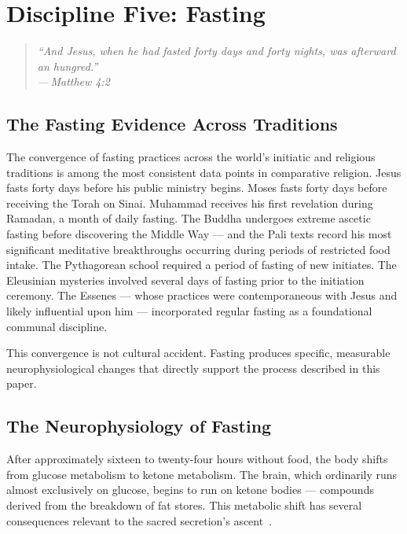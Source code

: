 \documentclass[12pt, a4paper]{article}
\newcommand{\epigraph}[2]{%
  \begin{quote}
    \itshape ``#1''\\[0.3em]
    \normalfont\small\hfill ---\,#2
  \end{quote}
}
\begin{document}
\section{Discipline Five: Fasting}
\label{sec:fasting}

\epigraph{And Jesus, when he had fasted forty days and forty nights, was
afterward an hungred.}{Matthew 4:2}

\subsection{The Fasting Evidence Across Traditions}

The convergence of fasting practices across the world's initiatic and religious
traditions is among the most consistent data points in comparative religion.
Jesus fasts forty days before his public ministry begins. Moses fasts forty
days before receiving the Torah on Sinai. Muhammad receives his first
revelation during Ramadan, a month of daily fasting. The Buddha undergoes
extreme ascetic fasting before discovering the Middle Way — and the Pali texts
record his most significant meditative breakthroughs occurring during periods
of restricted food intake. The Pythagorean school required a period of fasting
of new initiates. The Eleusinian mysteries involved several days of fasting
prior to the initiation ceremony. The Essenes — whose practices were
contemporaneous with Jesus and likely influential upon him — incorporated
regular fasting as a foundational communal discipline.

This convergence is not cultural accident. Fasting produces specific,
measurable neurophysiological changes that directly support the process
described in this paper.

\subsection{The Neurophysiology of Fasting}

After approximately sixteen to twenty-four hours without food, the body shifts
from glucose metabolism to ketone metabolism. The brain, which ordinarily runs
almost exclusively on glucose, begins to run on ketone bodies — compounds
derived from the breakdown of fat stores. This metabolic shift has several
consequences relevant to the sacred secretion's ascent~\autocite{mattson2014}.
\end{document}
